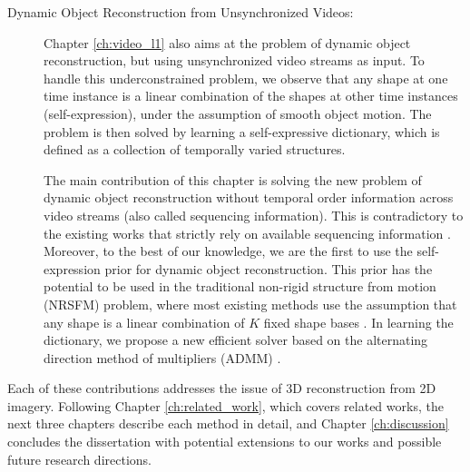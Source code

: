 \begin{description}
\item[Dynamic Object Reconstruction from Unsynchronized Videos:]
Chapter \ref{ch:video_l1} also aims at the problem of dynamic object reconstruction, but using unsynchronized video streams as input. To handle this underconstrained problem, we observe that any shape at one time instance is a linear combination of the shapes at other time instances (self-expression), under the assumption of smooth object motion. The problem is then solved by learning a self-expressive dictionary, which is defined as a collection of temporally varied structures. 

The main contribution of this chapter is solving the new problem of dynamic object reconstruction without temporal order information across video streams (also called sequencing information). This is contradictory to the existing works that strictly rely on available sequencing information \cite{Park_ECCV2010,Valmadre_CVPR2012}. 
Moreover, to the best of our knowledge, we are the first to use the self-expression prior for dynamic object reconstruction. This prior has the potential to be used in the traditional non-rigid structure from motion (NRSFM) problem, where most existing methods use the assumption that any shape is a linear combination of $K$ fixed shape bases \cite{dai2014simple,Bregler_CVPR2000}. In learning the dictionary, we propose a new efficient solver based on the alternating direction method of multipliers (ADMM) \cite{boyd2011distributed}.

\end{description}

Each of these contributions addresses the issue of 3D reconstruction from 2D imagery. Following Chapter \ref{ch:related_work}, which covers related works, the next three chapters describe each method in detail, and Chapter \ref{ch:discussion} concludes the dissertation with potential extensions to our works and possible future research directions. 

